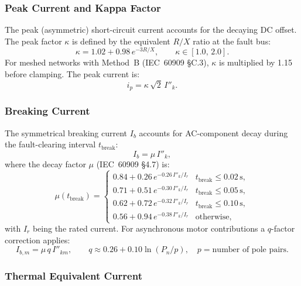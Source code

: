 \subsubsection{Peak Current and Kappa Factor}

The peak (asymmetric) short-circuit current accounts for the decaying
DC offset.  The peak factor $\kappa$ is defined by the equivalent
$R/X$ ratio at the fault bus:
\begin{equation}
  \kappa = 1.02 + 0.98\,e^{-3R/X}, \qquad \kappa \in [1.0,\,2.0].
  \label{eq:sc-kappa}
\end{equation}
For meshed networks with Method~B (IEC~60909 §C.3), $\kappa$ is
multiplied by 1.15 before clamping.  The peak current is:
\begin{equation}
  i_p = \kappa\,\sqrt{2}\,I''_k.
  \label{eq:sc-ip}
\end{equation}

\subsubsection{Breaking Current}

The symmetrical breaking current $I_b$ accounts for AC-component decay
during the fault-clearing interval $t_{\text{break}}$:
\begin{equation}
  I_b = \mu\,I''_k,
  \label{eq:sc-Ib}
\end{equation}
where the decay factor $\mu$ (IEC~60909 \S4.7) is:
\begin{equation}
  \mu(t_{\text{break}}) = \begin{cases}
    0.84 + 0.26\,e^{-0.26\,I''_k/I_r} & t_{\text{break}} \le 0.02\,\text{s}, \\
    0.71 + 0.51\,e^{-0.30\,I''_k/I_r} & t_{\text{break}} \le 0.05\,\text{s}, \\
    0.62 + 0.72\,e^{-0.32\,I''_k/I_r} & t_{\text{break}} \le 0.10\,\text{s}, \\
    0.56 + 0.94\,e^{-0.38\,I''_k/I_r} & \text{otherwise},
  \end{cases}
\end{equation}
with $I_r$ being the rated current.  For asynchronous motor contributions
a $q$-factor correction applies:
\begin{equation}
  I_{b,m} = \mu\,q\,I''_{km}, \qquad
  q \approx 0.26 + 0.10\ln(P_n/p), \quad p = \text{number of pole pairs}.
\end{equation}

\subsubsection{Thermal Equivalent Current}

